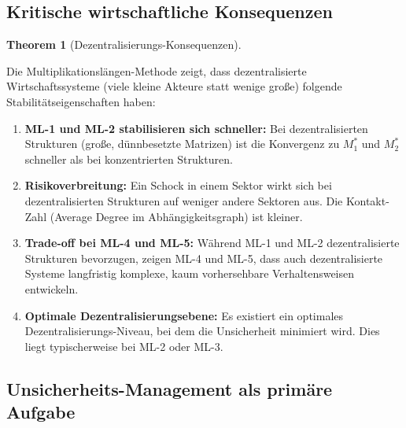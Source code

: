\documentclass[a4paper,12pt]{article}
\theoremstyle{definition}
\newtheorem{theorem}{Theorem}
\begin{document}
\subsection{Kritische wirtschaftliche Konsequenzen}

\begin{theorem}[Dezentralisierungs-Konsequenzen]
\label{thm:dezentralisierung}

Die Multiplikationslängen-Methode zeigt, dass dezentralisierte Wirtschaftssysteme (viele kleine Akteure statt wenige große) folgende Stabilitätseigenschaften haben:

\begin{enumerate}

\item \textbf{ML-1 und ML-2 stabilisieren sich schneller:} Bei dezentralisierten Strukturen (große, dünnbesetzte Matrizen) ist die Konvergenz zu $M_1^*$ und $M_2^*$ schneller als bei konzentrierten Strukturen.

\item \textbf{Risikoverbreitung:} Ein Schock in einem Sektor wirkt sich bei dezentralisierten Strukturen auf weniger andere Sektoren aus. Die Kontakt-Zahl (Average Degree im Abhängigkeitsgraph) ist kleiner.

\item \textbf{Trade-off bei ML-4 und ML-5:} Während ML-1 und ML-2 dezentralisierte Strukturen bevorzugen, zeigen ML-4 und ML-5, dass auch dezentralisierte Systeme langfristig komplexe, kaum vorhersehbare Verhaltensweisen entwickeln.

\item \textbf{Optimale Dezentralisierungsebene:} Es existiert ein optimales Dezentralisierungs-Niveau, bei dem die Unsicherheit minimiert wird. Dies liegt typischerweise bei ML-2 oder ML-3.

\end{enumerate}

\end{theorem}

\subsection{Unsicherheits-Management als primäre Aufgabe}
\end{document}
